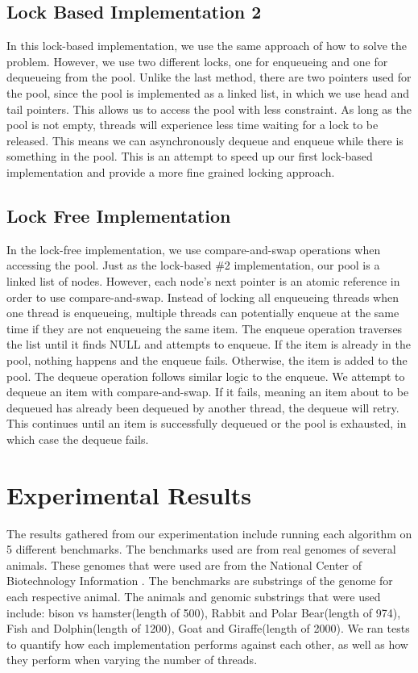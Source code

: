 \documentclass[letterpaper, 10 pt, conference]{IEEEconf}
\begin{document}
\subsection{Lock Based Implementation 2}
In this lock-based implementation, we use the same approach of how to solve the problem. However, we use two different locks, one for enqueueing and one for dequeueing from the pool. Unlike the last method, there are two pointers used for the pool, since the pool is implemented as a linked list, in which we use head and tail pointers. This allows us to access the pool with less constraint. As long as the pool is not empty, threads will experience less time waiting for a lock to be released. This means we can asynchronously dequeue and enqueue while there is something in the pool. 
This is an attempt to speed up our first lock-based implementation and provide a more fine grained locking approach. 

\subsection{Lock Free Implementation}
In the lock-free implementation, we use compare-and-swap operations when accessing the pool. Just as the lock-based \#2 implementation, our pool is a linked list of nodes. However, each node's next pointer is an atomic reference in order to use compare-and-swap. Instead of locking all enqueueing threads when one thread is enqueueing, multiple threads can potentially enqueue at the same time if they are not enqueueing the same item. The enqueue operation traverses the list until it finds NULL and attempts to enqueue. If the item is already in the pool, nothing happens and the enqueue fails. Otherwise, the item is added to the pool. The dequeue operation follows similar logic to the enqueue. We attempt to dequeue an item with compare-and-swap. If it fails, meaning an item about to be dequeued has already been dequeued by another thread, the dequeue will retry. This continues until an item is successfully dequeued or the pool is exhausted, in which case the dequeue fails. 

\section{Experimental Results}
The results gathered from our experimentation include running each algorithm on 5 different benchmarks. The benchmarks used are from real genomes of several animals. These genomes that were used are from the National Center of Biotechnology Information\cite{ncbi} . The benchmarks are substrings of the genome for each respective animal. The animals and genomic substrings that were used include: bison vs hamster(length of 500), Rabbit and Polar Bear(length of 974), Fish and Dolphin(length of 1200), Goat and Giraffe(length of 2000). We ran tests to quantify how each implementation performs against each other, as well as how they perform when varying the number of threads. 
\end{document}
